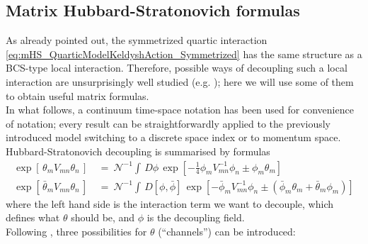 \documentclass[a4paper,11pt, english]{article}
\theoremstyle{remark}
\newcommand{\nline}{\\[0.3cm]}
\begin{document}
\subsection{Matrix Hubbard-Stratonovich formulas}
As already pointed out, the symmetrized quartic interaction \eqref{eq:mHS_QuarticModelKeldyshAction_Symmetrized} has the same structure as a BCS-type local interaction. Therefore, possible ways of decoupling such a local interaction are unsurprisingly well studied (e.g. \cite{Altland2010Condensed}); here we will use some of them to obtain useful matrix formulas. \\
In what follows, a continuum time-space notation has been used for convenience of notation; every result can be straightforwardly applied to the previously introduced model switching to a discrete space index or to momentum space. \nline
Hubbard-Stratonovich decoupling is summarised by formulas
\begin{subequations}
\label{eq:mHS_genericHubStrat}
 \begin{align}
   \exp\left[\,\theta_mV_{mn}\theta_n\,\right]\ &=\ \mathcal{N}^{-1} \int\,D\phi\,\exp\left[-\frac{1}{4}\phi_mV_{mn}^{-1}\phi_n \pm \phi_m\theta_m\right] \\
   \exp\left[\,\bar{\theta}_mV_{mn}\theta_n\,\right]\ &=\ \mathcal{N}^{-1} \int\,D[\phi,\bar{\phi}]\,\exp\left[-\bar{\phi}_mV_{mn}^{-1}\phi_n^{ } \pm (\bar{\phi}_m\theta^{ }_m + \bar{\theta}_m\phi_m)\right] 
 \end{align}
\end{subequations}
where the left hand side is the interaction term we want to decouple, which defines what $\theta$ should be, and $\phi$ is the decoupling field.\\ Following \cite{Altland2010Condensed}, three possibilities for $\theta$ (``channels'') can be introduced:
\end{document}
